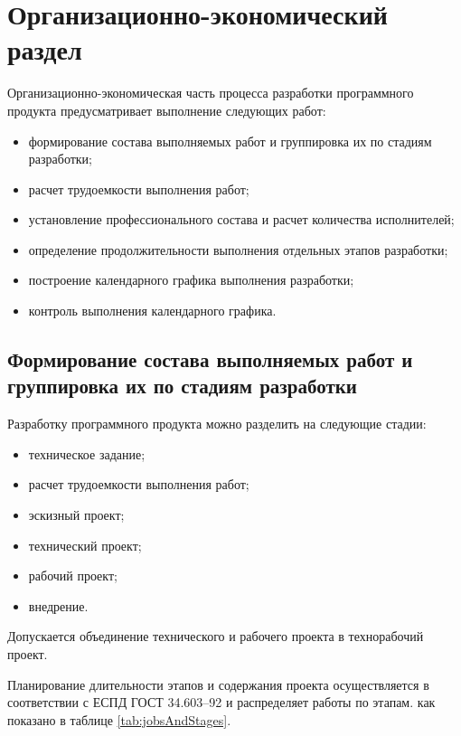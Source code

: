 \chapter{Организационно-экономический раздел}

Организационно-экономическая часть процесса разработки программного продукта предусматривает выполнение следующих работ:
\begin{itemize}
\item формирование состава выполняемых работ и группировка их по стадиям разработки;
\item расчет трудоемкости выполнения работ;
\item установление профессионального состава и расчет количества исполнителей;
\item определение продолжительности выполнения отдельных этапов разработки;
\item построение календарного графика выполнения разработки;
\item контроль выполнения календарного графика.
\end{itemize}

\section{Формирование состава выполняемых работ и группировка их по стадиям разработки}

Разработку программного продукта можно разделить на следующие стадии:

\begin{itemize}
\item техническое задание;
\item расчет трудоемкости выполнения работ;
\item эскизный проект;
\item технический проект;
\item рабочий проект;
\item внедрение.
\end{itemize}

Допускается объединение технического и рабочего проекта в технорабочий проект.

Планирование длительности этапов и содержания проекта осуществляется в соответствии с ЕСПД ГОСТ 34.603--92 и распределяет работы по этапам. как показано в таблице \ref{tab:jobsAndStages}.

